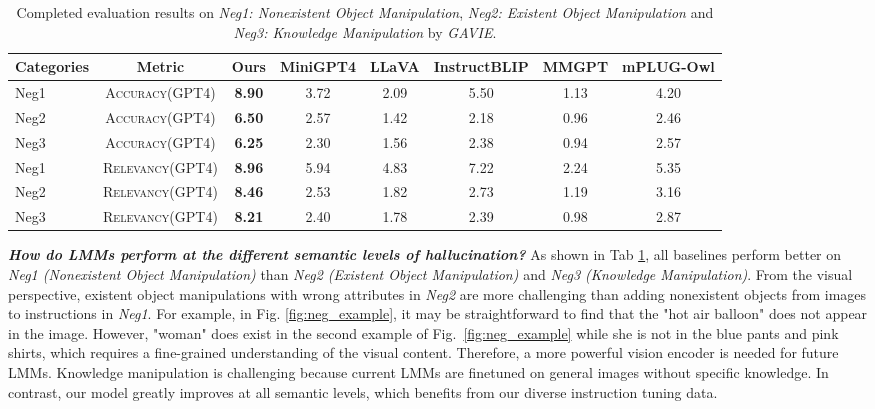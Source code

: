 \begin{table}[t]
\setlength\tabcolsep{3pt}
\centering
\small
\begin{tabular}{lccccccc}
\toprule[1.5pt]
Categories& Metric&\textbf{Ours} & MiniGPT4 & LLaVA & InstructBLIP & MMGPT& mPLUG-Owl\\
\midrule
Neg1 & \textsc{Accuracy(GPT4)} & \textbf{8.90} & 3.72 & 2.09 & 5.50 & 1.13 & 4.20\\
Neg2 & \textsc{Accuracy(GPT4)} & \textbf{6.50} & 2.57 & 1.42 & 2.18 & 0.96& 2.46\\
Neg3 & \textsc{Accuracy(GPT4)} & \textbf{6.25} & 2.30 & 1.56 & 2.38 & 0.94& 2.57\\
\midrule
Neg1 & \textsc{Relevancy(GPT4)} & \textbf{8.96} & 5.94 & 4.83 & 7.22 & 2.24 & 5.35\\
Neg2 & \textsc{Relevancy(GPT4)} & \textbf{8.46} & 2.53 & 1.82 & 2.73 & 1.19& 3.16\\
Neg3 & \textsc{Relevancy(GPT4)} & \textbf{8.21} & 2.40 & 1.78 & 2.39 & 0.98& 2.87\\
\bottomrule[1.5pt]
\end{tabular}
\vspace{-2mm}
\caption{
Completed evaluation results on \textit{Neg1: Nonexistent Object Manipulation}, \textit{Neg2: Existent Object Manipulation} and \textit{Neg3: Knowledge Manipulation} by \textit{GAVIE}.}
\label{tab:neg1neg2}
\vspace{-0.1in}
\end{table}

\textbf{\textit{How do LMMs perform at the different semantic levels of hallucination? }}As shown in Tab \ref{tab:neg1neg2}, all baselines perform better on \textit{Neg1 (Nonexistent Object Manipulation)} than \textit{Neg2 (Existent Object Manipulation)} and \textit{Neg3 (Knowledge Manipulation)}. From the visual perspective, existent object manipulations with wrong attributes in \textit{Neg2} are more challenging than adding nonexistent objects from images to instructions in \textit{Neg1}. For example, in Fig. \ref{fig:neg_example}, it %
may be straightforward to find that the "hot air balloon" does not appear in the image. However, "woman" does exist in the second example of Fig.~\ref{fig:neg_example} while she is not in the blue pants and pink shirts, which requires a fine-grained understanding of the visual content. Therefore, a more powerful vision encoder is needed for future LMMs. Knowledge manipulation is challenging because current LMMs are finetuned on general images without specific knowledge. In contrast, our model greatly improves at all semantic levels, which benefits from our diverse instruction tuning data. 



